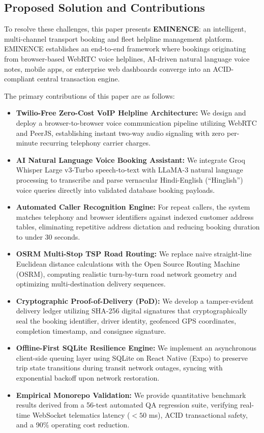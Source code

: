 \documentclass[conference]{IEEEtran}
\begin{document}
\subsection{Proposed Solution and Contributions}
To resolve these challenges, this paper presents \textbf{EMINENCE}: an intelligent, multi-channel transport booking and fleet helpline management platform. EMINENCE establishes an end-to-end framework where bookings originating from browser-based WebRTC voice helplines, AI-driven natural language voice notes, mobile apps, or enterprise web dashboards converge into an ACID-compliant central transaction engine.

The primary contributions of this paper are as follows:
\begin{itemize}
    \item \textbf{Twilio-Free Zero-Cost VoIP Helpline Architecture:} We design and deploy a browser-to-browser voice communication pipeline utilizing WebRTC and PeerJS, establishing instant two-way audio signaling with zero per-minute recurring telephony carrier charges.
    \item \textbf{AI Natural Language Voice Booking Assistant:} We integrate Groq Whisper Large v3-Turbo speech-to-text with LLaMA-3 natural language processing to transcribe and parse vernacular Hindi-English (``Hinglish'') voice queries directly into validated database booking payloads.
    \item \textbf{Automated Caller Recognition Engine:} For repeat callers, the system matches telephony and browser identifiers against indexed customer address tables, eliminating repetitive address dictation and reducing booking duration to under 30 seconds.
    \item \textbf{OSRM Multi-Stop TSP Road Routing:} We replace naive straight-line Euclidean distance calculations with the Open Source Routing Machine (OSRM), computing realistic turn-by-turn road network geometry and optimizing multi-destination delivery sequences.
    \item \textbf{Cryptographic Proof-of-Delivery (PoD):} We develop a tamper-evident delivery ledger utilizing SHA-256 digital signatures that cryptographically seal the booking identifier, driver identity, geofenced GPS coordinates, completion timestamp, and consignee signature.
    \item \textbf{Offline-First SQLite Resilience Engine:} We implement an asynchronous client-side queuing layer using SQLite on React Native (Expo) to preserve trip state transitions during transit network outages, syncing with exponential backoff upon network restoration.
    \item \textbf{Empirical Monorepo Validation:} We provide quantitative benchmark results derived from a 56-test automated QA regression suite, verifying real-time WebSocket telematics latency ($<50$ ms), ACID transactional safety, and a 90\% operating cost reduction.
\end{itemize}
\end{document}
